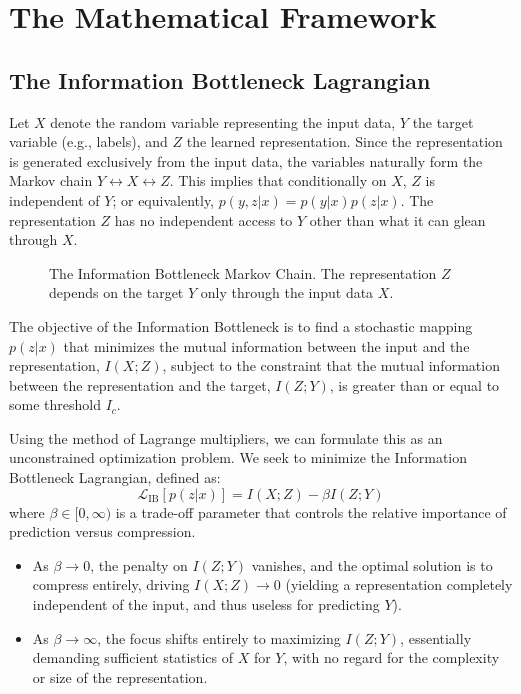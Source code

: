 \section{The Mathematical Framework}

\subsection{The Information Bottleneck Lagrangian}

Let $X$ denote the random variable representing the input data, $Y$ the target variable (e.g., labels), and $Z$ the learned representation. Since the representation is generated exclusively from the input data, the variables naturally form the Markov chain $Y \leftrightarrow X \leftrightarrow Z$. This implies that conditionally on $X$, $Z$ is independent of $Y$; or equivalently, $p(y, z | x) = p(y|x)p(z|x)$. The representation $Z$ has no independent access to $Y$ other than what it can glean through $X$.

\begin{figure}[htbp]
    \centering
    \caption{The Information Bottleneck Markov Chain. The representation $Z$ depends on the target $Y$ only through the input data $X$.}
    \label{fig:ib_markov}
\end{figure}

The objective of the Information Bottleneck is to find a stochastic mapping $p(z|x)$ that minimizes the mutual information between the input and the representation, $I(X; Z)$, subject to the constraint that the mutual information between the representation and the target, $I(Z; Y)$, is greater than or equal to some threshold $I_c$. 

Using the method of Lagrange multipliers, we can formulate this as an unconstrained optimization problem. We seek to minimize the Information Bottleneck Lagrangian, defined as:
\begin{equation}
    \mathcal{L}_{\text{IB}}[p(z|x)] = I(X; Z) - \beta I(Z; Y)
\end{equation}
where $\beta \in [0, \infty)$ is a trade-off parameter that controls the relative importance of prediction versus compression.
\begin{itemize}
    \item As $\beta \to 0$, the penalty on $I(Z; Y)$ vanishes, and the optimal solution is to compress entirely, driving $I(X; Z) \to 0$ (yielding a representation completely independent of the input, and thus useless for predicting $Y$).
    \item As $\beta \to \infty$, the focus shifts entirely to maximizing $I(Z; Y)$, essentially demanding sufficient statistics of $X$ for $Y$, with no regard for the complexity or size of the representation.
\end{itemize}

